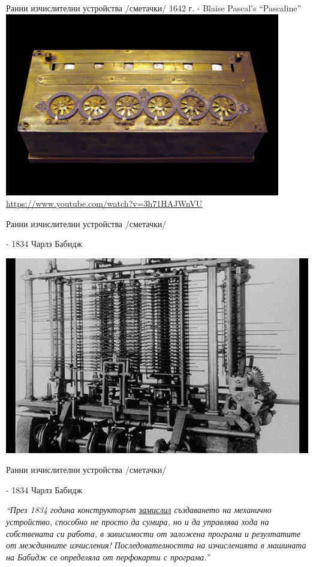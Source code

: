 \documentclass{beamer}
\begin{document}
\begin{frame}{Ранни изчислителни устройства /сметачки/}
  1642 г. - Blaise Pascal’s ``Pascaline''
  \includegraphics[width=0.9\textwidth]{pascaline}
  \url{https://www.youtube.com/watch?v=3h71HAJWnVU}
\end{frame}


\begin{frame}[plain]{Ранни изчислителни устройства /сметачки/}
  
  - 1834 Чарлз Бабидж

  \includegraphics[width=\textwidth]{babidge}

\end{frame}


\begin{frame}[plain]{Ранни изчислителни устройства /сметачки/}
  
  - 1834 Чарлз Бабидж

\textit{``През 1834 година конструкторът \underline{замислил} създаването на механично устройство, способно не просто да сумира, но и да управлява хода на собствената си работа, в зависимости от заложена програма и резултатите от междинните изчисления! Последователността на изчисленията в машината на Бабидж се определяла от перфокарти с програма.''}

\end{frame}
\end{document}
